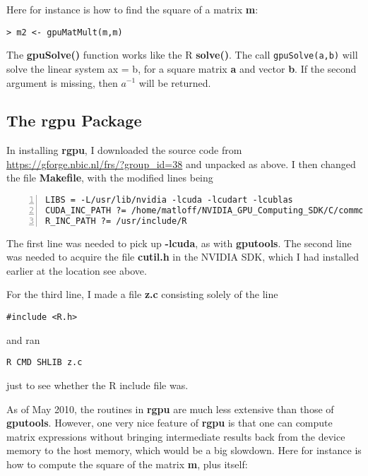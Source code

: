 Here for instance is how to find the square of a matrix {\bf m}:

\begin{lstlisting}
> m2 <- gpuMatMult(m,m)
\end{lstlisting}

The {\bf gpuSolve()} function works like the R {\bf solve()}.  The call
\lstinline{gpuSolve(a,b)} will solve the linear system ax = b, for a
square matrix {\bf a} and vector {\bf b}.  If the second argument is
missing, then $a^{-1}$ will be returned.

\subsection{The rgpu Package}
\label{rgpu}

In installing {\bf rgpu}, I downloaded the source code from
\url{https://gforge.nbic.nl/frs/?group_id=38} and unpacked as above.
I then changed the file {\bf Makefile}, with the modified lines being

\begin{lstlisting}[numbers=left]
LIBS = -L/usr/lib/nvidia -lcuda -lcudart -lcublas
CUDA_INC_PATH ?= /home/matloff/NVIDIA_GPU_Computing_SDK/C/common/inc
R_INC_PATH ?= /usr/include/R
\end{lstlisting}

The first line was needed to pick up {\bf -lcuda}, as with {\bf
gputools}.  The second line was needed to acquire the file {\bf cutil.h}
in the NVIDIA SDK, which I had installed earlier at the location see
above.

For the third line, I made a file {\bf z.c} consisting solely of the
line

\begin{lstlisting}
#include <R.h>
\end{lstlisting}

and ran

\begin{lstlisting}
R CMD SHLIB z.c
\end{lstlisting}

just to see whether the R include file was.

As of May 2010, the routines in {\bf rgpu} are much less extensive than
those of {\bf gputools}.  However, one very nice feature of {\bf rgpu}
is that one can compute matrix expressions without bringing intermediate
results back from the device memory to the host memory, which would be a
big slowdown.  Here for instance is how to compute the square of the
matrix {\bf m}, plus itself:


